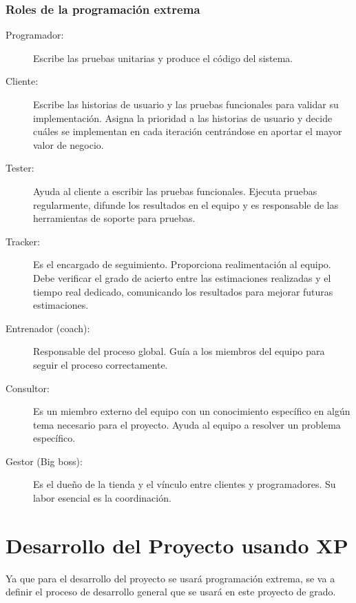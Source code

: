 

      \subsubsection{Roles de la programación extrema}
      \label{subs:roles_xp}

      \begin{description}
        \item[Programador:] Escribe las pruebas unitarias y produce el código del sistema.
        \item[Cliente:] Escribe las historias de usuario y las pruebas funcionales para validar su implementación. Asigna la prioridad a las historias de usuario y decide cuáles se implementan en cada iteración centrándose en aportar el mayor valor de negocio.
        \item[Tester:] Ayuda al cliente a escribir las pruebas funcionales. Ejecuta pruebas regularmente, difunde los resultados en el equipo y es responsable de las herramientas de soporte para pruebas.
        \item[Tracker:] Es el encargado de seguimiento. Proporciona realimentación al equipo. Debe verificar el grado de acierto entre las estimaciones realizadas y el tiempo real dedicado, comunicando los resultados para mejorar futuras estimaciones.
        \item[Entrenador (coach):] Responsable del proceso global. Guía a los miembros del equipo para seguir el proceso correctamente.
        \item[Consultor:] Es un miembro externo del equipo con un conocimiento específico en algún tema necesario para el proyecto. Ayuda al equipo a resolver un problema específico.
        \item[Gestor (Big boss):] Es el dueño de la tienda y el vínculo entre clientes y programadores. Su labor esencial es la coordinación.\cite{xpcyta}
      \end{description}



      \section{Desarrollo del Proyecto usando XP} %
      \label{sec:desarrollo}

      Ya que para el desarrollo del proyecto se usará programación extrema,
      se va a definir el proceso de desarrollo general que se usará en este proyecto de grado.\\

